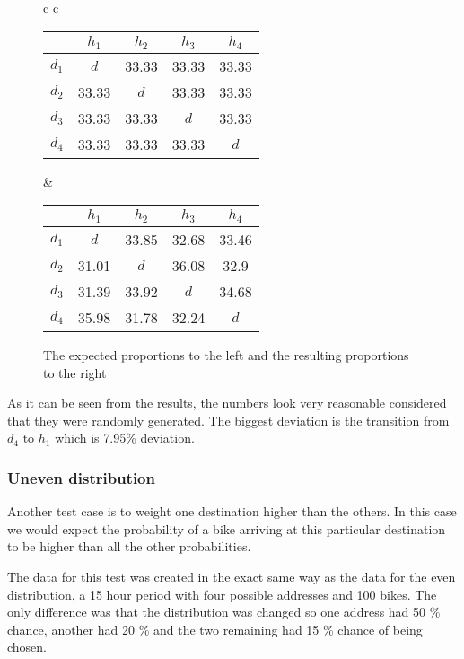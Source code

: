 \begin{figure}
	
	\begin{tabular} {c c }
		
		\begin{tabular}{ | c | c c c c |}
			\hline
			& $ h_1 $ & $ h_2 $ & $ h_3 $ & $ h_4 $\\
			\hline
			$ d_1 $ & $ d $ & 33.33 & 33.33 & 33.33\\
			$ d_2 $ & 33.33 & $ d $ & 33.33 & 33.33\\
			$ d_3 $ & 33.33 & 33.33 & $ d $ & 33.33\\
			$ d_4 $ & 33.33 & 33.33 & 33.33 & $ d $\\
			\hline
		\end{tabular}
		
		&
		
		\begin{tabular}{ | c | c c c c |}
			\hline
			& $ h_1 $ & $ h_2 $ & $ h_3 $ & $ h_4 $\\
			\hline
			$ d_1 $ & $ d $ & 33.85 & 32.68 & 33.46\\
			$ d_2 $ & 31.01 & $ d $ & 36.08 & 32.9\\
			$ d_3 $ & 31.39 & 33.92 & $ d $ & 34.68 \\
			$ d_4 $ & 35.98 & 31.78 & 32.24 & $ d $\\
			\hline
		\end{tabular}
	\end{tabular}
	\caption{The expected proportions to the left and the resulting proportions to the right}\label{even_results}
\end{figure}

As it can be seen from the results, the numbers look very reasonable considered that they were randomly generated. 
The biggest deviation is the transition from $ d_4 $ to $ h_1 $ which is 7.95\% deviation. 

\subsubsection{Uneven distribution}
Another test case is to weight one destination higher than the others.
In this case we would expect the probability of a bike arriving at this particular destination to be higher than all the other probabilities.

The data for this test was created in the exact same way as the data for the even distribution, a 15 hour period with four possible addresses and 100 bikes.
The only difference was that the distribution was changed so one address had 50 \% chance, another had 20 \% and the two remaining had 15 \% chance of being chosen.

